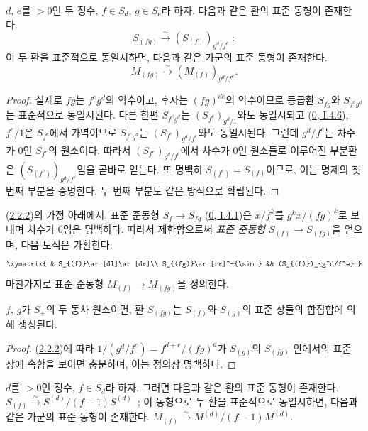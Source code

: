 \begin{lemma}[2.2.2]
\label{II.2.2.2-ko}
$d$, $e$를 $>0$인 두 정수, $f\in S_d$, $g\in S_e$라 하자. 다음과 같은
환의 표준 동형이 존재한다.
\[
  S_{(fg)}\xrightarrow{\sim}(S_{(f)})_{g^d/f^e}~;
\]
이 두 환을 표준적으로 동일시하면, 다음과 같은 가군의 표준 동형이
존재한다.
\[
  M_{(fg)}\xrightarrow{\sim}(M_{(f)})_{g^d/f^e}.
\]
\end{lemma}

\begin{proof}
실제로 $fg$는 $f^e g^d$의 약수이고, 후자는 $(fg)^{de}$의 약수이므로
등급환 $S_{fg}$와 $S_{f^e g^d}$는 표준적으로 동일시된다. 다른 한편
$S_{f^e g^d}$는 $(S_{f^e})_{g^d/1}$와도 동일시되고
(\hyperref[0.1.4.6-ko]{0, I.4.6}), $f^e/1$은 $S_{f^e}$에서 가역이므로
$S_{f^e g^d}$는 $(S_{f^e})_{g^d/f^e}$와도 동일시된다. 그런데
$g^d/f^e$는 차수가 $0$인 $S_{f^e}$의 원소이다. 따라서
$(S_{f^e})_{g^d/f^e}$에서 차수가 $0$인 원소들로 이루어진 부분환은
$(S_{(f^e)})_{g^d/f^e}$임을 곧바로 얻는다. 또 명백히
$S_{(f^e)}=S_{(f)}$이므로, 이는 명제의 첫 번째 부분을 증명한다.
두 번째 부분도 같은 방식으로 확립된다.
\end{proof}

\begin{env}[2.2.3]
\label{II.2.2.3-ko}
(\hyperref[II.2.2.2-ko]{2.2.2})의 가정 아래에서, 표준 준동형
$S_f\to S_{fg}$ (\hyperref[0.1.4.1-ko]{0, I.4.1})은 $x/f^k$를
$g^k x/(fg)^k$로 보내며 차수가 $0$임은 명백하다. 따라서
제한함으로써
\emph{표준 준동형 $S_{(f)}\to S_{(fg)}$}을 얻으며, 다음 도식은
가환한다.
\[
  \xymatrix{
    & S_{(f)}\ar[dl]\ar[dr]\\
    S_{(fg)}\ar[rr]^-{\sim} && (S_{(f)})_{g^d/f^e}
  }
\]
마찬가지로 표준 준동형 $M_{(f)}\to M_{(fg)}$을 정의한다.
\end{env}

\begin{lemma}[2.2.4]
\label{II.2.2.4-ko}
$f$, $g$가 $S_+$의 두 동차 원소이면, 환 $S_{(fg)}$는 $S_{(f)}$와
$S_{(g)}$의 표준 상들의 합집합에 의해 생성된다.
\end{lemma}

\begin{proof}
(\hyperref[II.2.2.2-ko]{2.2.2})에 따라
$1/(g^d/f^e)=f^{d+e}/(fg)^d$가 $S_{(g)}$의 $S_{(fg)}$ 안에서의 표준
상에 속함을 보이면 충분하며, 이는 정의상 명백하다.
\end{proof}

\begin{proposition}[2.2.5]
\label{II.2.2.5-ko}
$d$를 $>0$인 정수, $f\in S_d$라 하자. 그러면 다음과 같은 환의
표준 동형이 존재한다.
$S_{(f)}\xrightarrow{\sim}S^{(d)}/(f-1)S^{(d)}$~; 이 동형으로 두 환을
표준적으로 동일시하면, 다음과 같은 가군의 표준 동형이 존재한다.
$M_{(f)}\xrightarrow{\sim}M^{(d)}/(f-1)M^{(d)}$.
\end{proposition}

